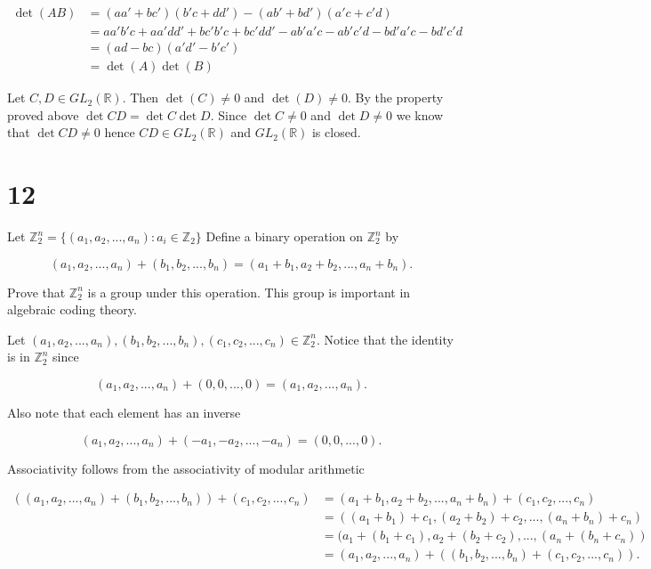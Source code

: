\documentclass[a4paper]{article}
\begin{document}
\begin{align*}
\det(AB) &= (aa' + bc')(b'c + dd') - (ab' + bd')(a'c + c'd) \\
&= aa'b'c + aa'dd' + bc'b'c + bc'dd' - ab'a'c - ab'c'd - bd'a'c - bd'c'd \\
&= (ad - bc) (a'd' - b'c') \\
&= \det(A) \det(B)
\end{align*}

\vspace{\baselineskip}

Let $C,D \in GL_2(\mathbb{R})$. Then $\det(C) \neq 0$ and $\det(D) \neq 0$. By the property proved above $\det{CD} = \det{C}\det{D}$. Since $\det{C} \neq 0$ and $\det{D} \neq 0$ we know that $\det{CD} \neq{0}$ hence $CD \in GL_2(\mathbb{R})$ and $GL_2(\mathbb{R})$ is closed.


\section*{12}

Let $\mathbb{Z}_2^n = \{ (a_1, a_2, ..., a_n) : a_i \in \mathbb{Z}_2 \}$ Define a binary operation on $\mathbb{Z}_2^n$ by 

$$(a_1, a_2, ..., a_n) + (b_1, b_2, ..., b_n) = (a_1+b_1, a_2+b_2, ..., a_n+b_n).$$

Prove that $\mathbb{Z}_2^n$ is a group under this operation. This group is important in algebraic coding theory.

\vspace{\baselineskip}

Let $(a_1, a_2, ..., a_n), (b_1, b_2, ..., b_n), (c_1, c_2, ..., c_n) \in \mathbb{Z}_2^n$. Notice that the identity is in $\mathbb{Z}_2^n$ since

$$(a_1, a_2, ..., a_n) + (0, 0, ..., 0) =  (a_1, a_2, ..., a_n).$$

Also note that each element has an inverse

$$(a_1, a_2, ..., a_n) + (-a_1, -a_2, ..., -a_n) = (0, 0, ..., 0).$$

Associativity follows from the associativity of modular arithmetic


\begin{align*}
((a_1, a_2, ..., a_n) + (b_1, b_2, ..., b_n)) + (c_1, c_2, ..., c_n) &= (a_1+b_1, a_2+b_2, ..., a_n+b_n) + (c_1, c_2, ..., c_n) \\
&= ((a_1+b_1) + c_1, (a_2+b_2) + c_2, ..., (a_n+b_n) + c_n) \\ 
&= (a_1 + (b_1+c_1), a_2 + (b_2+c_2), ..., (a_n + (b_n+c_n)) \\
&= (a_1, a_2, ..., a_n) + ((b_1, b_2, ..., b_n) + (c_1, c_2, ..., c_n)).
\end{align*}
\end{document}
